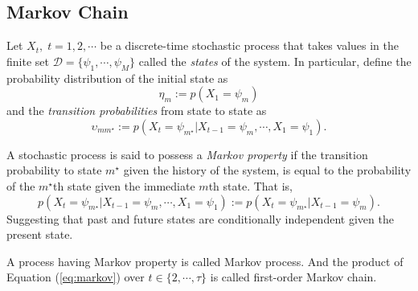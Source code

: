 \subsection{Markov Chain}\label{sec:markovchain}
Let $X_t,\;t=1,2,\cdots$ be a discrete-time stochastic process that takes values in the finite set $\mathscr{D}=\{\psi_1,\cdots,\psi_M\}$ called the \textit{states} of the system. In particular, define the probability distribution of the initial state as
\begin{equation}\label{eq:init}
\eta_{m}:= p(X_1=\psi_m)
\end{equation}
and the \textit{transition probabilities} from state to state as
\begin{equation}
\upsilon_{mm^{\star}}:= p(X_{t}=\psi_{m^{\star}}|X_{t-1}=\psi_{m},\cdots,X_1=\psi_1).
\end{equation}\vspace{-1cm}
\begin{defn}
A stochastic process is said to possess a \textit{Markov property} if the transition probability to state $m^{\star}$ given the history of the system, is equal to the probability of the $m^{\star}$th state given the immediate $m$th state. That is,
\begin{equation}
\label{eq:markov}
 p(X_{t}=\psi_{m^{\star}}|X_{t-1}=\psi_{m},\cdots,X_1=\psi_1):= p(X_{t}=\psi_{m^{\star}}|X_{t-1}=\psi_{m}).
\end{equation}
Suggesting that past and future states are conditionally independent given the present state.\end{defn}
\begin{remark}
A process having Markov property is called \textnormal{Markov process}. And the product of Equation (\ref{eq:markov}) over $t\in\{2,\cdots,\tau\}$ is called \textnormal{first-order Markov chain}.
\end{remark}

